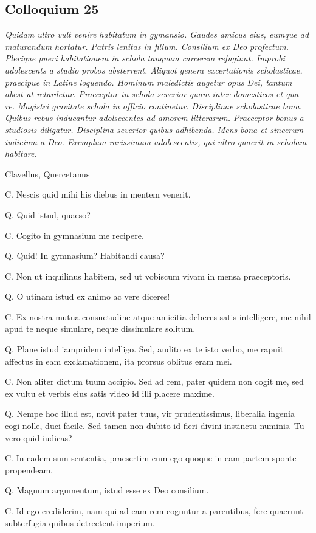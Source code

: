 \documentclass{article}
\begin{document}
\subsection{Colloquium 25}
\emph{Quidam ultro vult venire habitatum in gymansio. Gaudes amicus eius, eumque ad maturandum hortatur. Patris lenitas in filium. Consilium ex Deo profectum. Plerique pueri habitationem in schola tanquam carcerem refugiunt. Improbi adolescents a studio probos absterrent. Aliquot genera excertationis scholasticae, praecipue in Latine loquendo. Hominum maledictis augetur opus Dei, tantum abest ut retardetur. Praeceptor in schola severior quam inter domesticos et qua re. Magistri gravitate schola in officio continetur. Disciplinae scholasticae bona. Quibus rebus inducantur adolsecentes ad amorem litterarum. Praeceptor bonus a studiosis diligatur. Disciplina severior quibus adhibenda. Mens bona et sincerum iudicium a Deo. Exemplum rarissimum adolescentis, qui ultro quaerit in scholam habitare.}

Clavellus, Quercetanus

C. Nescis quid mihi his diebus in mentem venerit.

Q. Quid istud, quaeso?

C. Cogito in gymnasium me recipere.

Q. Quid! In gymnasium? Habitandi causa?

C. Non ut inquilinus habitem, sed ut vobiscum vivam in mensa praeceptoris.

Q. O utinam istud ex animo ac vere diceres!

C. Ex nostra mutua consuetudine atque amicitia deberes satis intelligere, me nihil apud te neque simulare, neque dissimulare solitum.

Q. Plane istud iampridem intelligo. Sed, audito ex te isto verbo, me rapuit affectus in eam exclamationem, ita prorsus oblitus eram mei.

C. Non aliter dictum tuum accipio. Sed ad rem, pater quidem non cogit me, sed ex vultu et verbis eius satis video id illi placere maxime.

Q. Nempe hoc illud est, novit pater tuus, vir prudentissimus, liberalia ingenia cogi nolle, duci facile. Sed tamen non dubito id fieri divini instinctu numinis. Tu vero quid iudicas?

C. In eadem sum sententia, praesertim cum ego quoque in eam partem sponte propendeam.

Q. Magnum argumentum, istud esse ex Deo consilium.

C. Id ego crediderim, nam qui ad eam rem coguntur a parentibus, fere quaerunt subterfugia quibus detrectent imperium.
\end{document}
